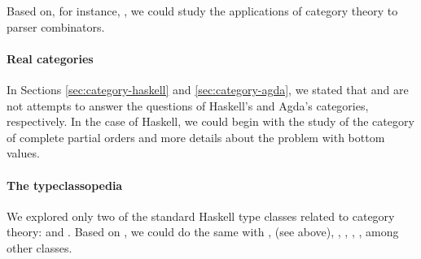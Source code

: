 Based on, for instance, \parencite[§ 16]{osullivan-et-al-2008}, we
could study the applications of category theory to parser combinators.

\paragraph{Real categories}

In Sections \ref{sec:category-haskell} and \ref{sec:category-agda}, we
stated that \hask and \agda are not attempts to answer the questions
of Haskell's and Agda's categories, respectively. In the case of
Haskell, we could begin with the study of the category of complete
partial orders \parencite[12.43]{hudak-et-al-2007} and more details
about the problem with bottom values.

\paragraph{The typeclassopedia}

We explored only two of the standard Haskell type classes related to
category theory:  and . Based
on \parencite{yorgey-2009}, we could do the same with
,  (see above),
, , ,
, among other classes.

\clearemptydoublepage
